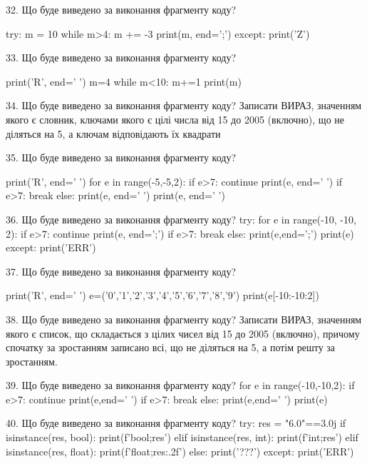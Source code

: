 \documentclass[11pt]{article}
\begin{document}

32. Що буде виведено за виконання фрагменту коду?

try:
    m = 10
    while m>4:
        m += -3
    print(m, end=';')
except:
    print('Z')



33. Що буде виведено за виконання фрагменту коду?

print('R', end=' ')
m=4
while m<10:
    m+=1
print(m)



34. Що буде виведено за виконання фрагменту коду?
Записати ВИРАЗ, значенням якого є словник, ключами якого є цілі числа від 15 до 2005 (включно), що не діляться на 5, а ключам відповідають їх квадрати 


35. Що буде виведено за виконання фрагменту коду?

print('R', end=' ')
for e in range(-5,-5,2):
    if e>7:
        continue
        print(e, end=' ')
    if e>7:
        break
    else:
        print(e, end=' ')
    print(e, end=' ')


36. Що буде виведено за виконання фрагменту коду?
try:
    for e in range(-10, -10, 2):
        if e>7:
            continue
        print(e, end=';')
        if e>7:
            break
    else:
        print(e,end=';')
    print(e)
except:
    print('ERR')


37. Що буде виведено за виконання фрагменту коду?

print('R', end=' ')
e=('0','1','2','3','4','5','6','7','8','9')
print(e[-10:-10:2])



38. Що буде виведено за виконання фрагменту коду?
Записати ВИРАЗ, значенням якого є список, що складається з цілих чисел від 15 до 2005 (включно), причому спочатку за зростанням записано всі, що не діляться на 5, а потім решту за зростанням.

39. Що буде виведено за виконання фрагменту коду?
for e in range(-10,-10,2):
    if e>7:
        continue
        print(e,end=' ')
    if e>7:
        break
    else:
        print(e,end=' ')
    print(e)


40. Що буде виведено за виконання фрагменту коду?
try:
    res = "6.0"==3.0j
    if isinstance(res, bool):
        print(f'bool;{res}')
    elif isinstance(res, int):
        print(f'int;{res}')
    elif isinstance(res, float):
        print(f'float;{res:.2f}')
    else:
        print('???')
except:
    print('ERR')
\end{document}
